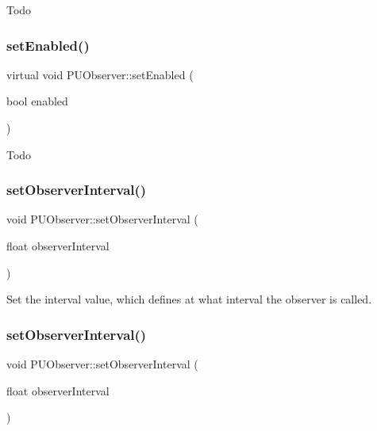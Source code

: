 Todo \mbox{\label{classPUObserver_abb0f7240f433f41756e28ed4db707b1e}} 
\subsubsection{\texorpdfstring{set\+Enabled()}{setEnabled()}\hspace{0.1cm}{\footnotesize\ttfamily [2/2]}}
{\footnotesize\ttfamily virtual void P\+U\+Observer\+::set\+Enabled (\begin{DoxyParamCaption}\item[{bool}]{enabled }\end{DoxyParamCaption})\hspace{0.3cm}{\ttfamily [virtual]}}

Todo \mbox{\label{classPUObserver_a8346c5d59ec8435e8d17dfc317ae4b90}} 
\subsubsection{\texorpdfstring{set\+Observer\+Interval()}{setObserverInterval()}\hspace{0.1cm}{\footnotesize\ttfamily [1/2]}}
{\footnotesize\ttfamily void P\+U\+Observer\+::set\+Observer\+Interval (\begin{DoxyParamCaption}\item[{float}]{observer\+Interval }\end{DoxyParamCaption})}

Set the interval value, which defines at what interval the observer is called. \mbox{\label{classPUObserver_a8346c5d59ec8435e8d17dfc317ae4b90}} 
\subsubsection{\texorpdfstring{set\+Observer\+Interval()}{setObserverInterval()}\hspace{0.1cm}{\footnotesize\ttfamily [2/2]}}
{\footnotesize\ttfamily void P\+U\+Observer\+::set\+Observer\+Interval (\begin{DoxyParamCaption}\item[{float}]{observer\+Interval }\end{DoxyParamCaption})}


